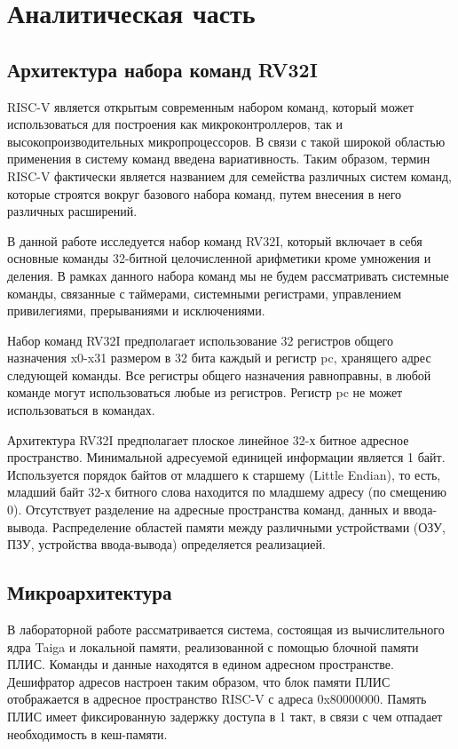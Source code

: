 \chapter{Аналитическая часть}
\label{cha:analysis}

\section{Архитектура набора команд RV32I}

RISC-V является открытым современным набором команд, который может использоваться для построения как микроконтроллеров, так и высокопроизводительных микропроцессоров. В связи с такой широкой областью применения в систему команд введена вариативность. Таким образом, термин RISC-V фактически является названием для семейства различных систем команд, которые строятся вокруг базового набора команд, путем внесения в него различных расширений.

В данной работе исследуется набор команд RV32I, который включает в себя основные команды 32-битной целочисленной арифметики кроме умножения и деления. В рамках данного набора команд мы не будем рассматривать системные команды, связанные с таймерами, системными регистрами, управлением привилегиями, прерываниями и исключениями.

Набор команд RV32I предполагает использование 32 регистров общего назначения x0-x31 размером в 32 бита каждый и регистр pc, хранящего адрес следующей команды. Все регистры общего назначения равноправны, в любой команде могут использоваться любые из регистров. Регистр pc не может использоваться в командах.

Архитектура RV32I предполагает плоское линейное 32-х битное адресное пространство. Минимальной адресуемой единицей информации является 1 байт. Используется порядок байтов от младшего к старшему (Little Endian), то есть, младший байт 32-х битного слова находится по младшему адресу (по смещению 0). Отсутствует разделение на адресные пространства команд, данных и ввода-вывода. Распределение областей памяти между различными устройствами (ОЗУ, ПЗУ, устройства ввода-вывода) определяется реализацией.

\section{Микроархитектура}

В лабораторной работе рассматривается система, состоящая из вычислительного ядра Taiga и локальной памяти, реализованной с помощью блочной памяти ПЛИС. Команды и данные находятся в едином адресном пространстве. Дешифратор адресов настроен таким образом, что блок памяти ПЛИС отображается в адресное пространство RISC-V с адреса 0x80000000. Память ПЛИС имеет фиксированную задержку доступа в 1 такт, в связи с чем отпадает необходимость в кеш-памяти. 

